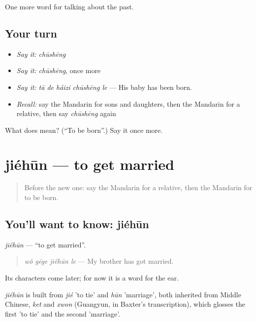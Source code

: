 \begin{grammarlens}[title={What you've built}]
One more word for talking about the past.
\end{grammarlens}

\subsection*{Your turn}
\begin{itemize}
\raggedright
  \item \emph{Say it:} \emph{chūshēng}
  \item \emph{Say it:} \emph{chūshēng}, once more
  \item \emph{Say it:} \emph{tā de háizi chūshēng le} — His baby has been born.
  \item \emph{Recall:} say the Mandarin for sons and daughters, then the Mandarin for a relative, then say \emph{chūshēng} again
\end{itemize}

\begin{tcolorbox}[breakable,colback=teal!4,colframe=teal!35!black,title={Before you move on}]
What does  mean? (\textquotedblleft{}To be born\textquotedblright{}.) Say it once more.
\end{tcolorbox}
\section[jiéhūn]{jiéhūn — to get married}

\label{lesson:ZH-C254-jiehun}



\begin{quote}
Before the new one: say the Mandarin for a relative, then the Mandarin for to be born.
\end{quote}

\subsection*{You'll want to know: jiéhūn}
\emph{jiéhūn} — \textquotedblleft{}to get married\textquotedblright{}.

\begin{quote}
\emph{wǒ gēge jiéhūn le} — My brother has got married.
\end{quote}

Its characters come later; for now it is a word for the ear.

\begin{cousinweb}
\emph{jiéhūn} is built from \emph{jié} 'to tie' and \emph{hūn} 'marriage', both inherited from Middle Chinese, \emph{ket} and \emph{xwon} (Guangyun, in Baxter's transcription), which glosses the first 'to tie' and the second 'marriage'.
\end{cousinweb}

